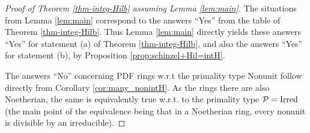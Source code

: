 \documentclass[11pt,a4paper,reqno]{amsart}
\def\Z{\mathbb{Z}}
\theoremstyle{definition}
\begin{document}
\begin{proof}[Proof of Theorem \ref{thm-integ-Hilb} assuming Lemma \ref{lem:main}] The situations from Lemma \ref{lem:main} correspond to the answers ``Yes'' from the table of Theorem \ref{thm-integ-Hilb}. Thus Lemma \ref{lem:main} directly yields these answers ``Yes'' for statement (a) of Theorem \ref{thm-integ-Hilb}, and also the answers ``Yes'' for statement (b), by Proposition \ref{prop:schinzel+Hil=intH}.

The answers ``No'' concerning PDF rings \hbox{w.r.t} the primality type Nonunit follow directly from Corollary \ref{cor:many_nonintH}. As the rings there are also Noetherian, the same is equivalently true \hbox{w.r.t.} to the primality type ${\mathcal P} = {\rm Irred}$ (the main point of the equivalence being that in a Noetherian ring, every nonunit is divisible by an irreducible).
\end{proof}
\end{document}
